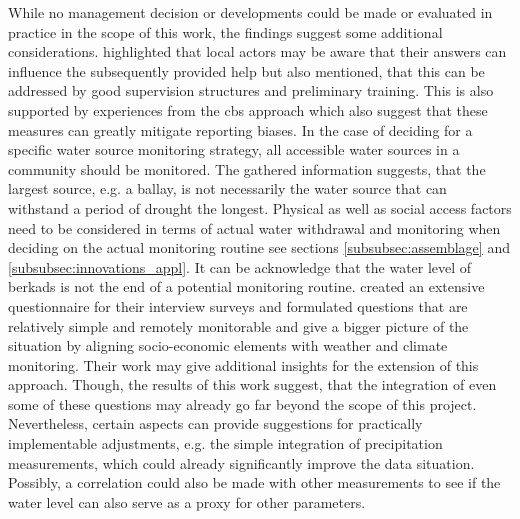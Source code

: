 While no management decision or developments could be made or evaluated in practice in the scope of this work, the findings suggest some additional considerations. \autocite{gualazziniEWEAEarlyWarning2021}highlighted that local actors may be aware that their answers can influence the subsequently provided help but also mentioned, that this can be addressed by good supervision structures and preliminary training. This is also supported by experiences from the \acrshort{cbs} approach which also suggest that these measures can greatly mitigate reporting biases.\newline
In the case of deciding for a specific water source monitoring strategy, all accessible water sources in a community should be monitored. The gathered information suggests, that the largest source, e.g. a ballay, is not necessarily the water source that can withstand a period of drought the longest. Physical as well as social access factors need to be considered in terms of actual water withdrawal and monitoring when deciding on the actual monitoring routine see sections \ref{subsubsec:assemblage} and \ref{subsubsec:innovations_appl}.\newline
It can be acknowledge that the water level of berkads is not the end of a potential monitoring routine. \autocite{unitednationschildrensfundunicefandworldhealthCoreQuestionsWater2018} created an extensive questionnaire for their interview surveys and \autocite{enenkelWhyPredictClimate2020} formulated questions that are relatively simple and remotely monitorable and give a bigger picture of the situation by aligning socio-economic elements with weather and climate monitoring. Their work may give additional insights for the extension of this approach. Though, the results of this work suggest, that the integration of even some of these questions may already go far beyond the scope of this project. Nevertheless, certain aspects can provide suggestions for practically implementable adjustments, e.g. the simple integration of precipitation measurements, which could already significantly improve the data situation. Possibly, a correlation could also be made with other measurements to see if the water level can also serve as a proxy for other parameters.\newline
